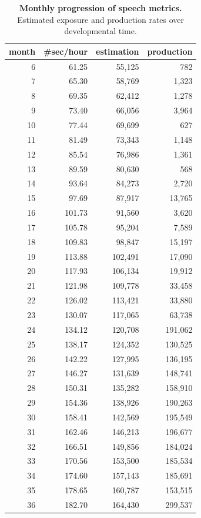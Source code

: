 \begin{table}[!h]
\centering
\begin{tabular}{rrrr}
\toprule
\textbf{month} & \textbf{\#sec/hour} & \textbf{estimation} & \textbf{production} \\
\midrule
6 & 61.25 & 55,125 & 782 \\
7 & 65.30 & 58,769 & 1,323 \\
8 & 69.35 & 62,412 & 1,278 \\
9 & 73.40 & 66,056 & 3,964 \\
10 & 77.44 & 69,699 & 627 \\
11 & 81.49 & 73,343 & 1,148 \\
12 & 85.54 & 76,986 & 1,361 \\
13 & 89.59 & 80,630 & 568 \\
14 & 93.64 & 84,273 & 2,720 \\
15 & 97.69 & 87,917 & 13,765 \\
16 & 101.73 & 91,560 & 3,620 \\
17 & 105.78 & 95,204 & 7,589 \\
18 & 109.83 & 98,847 & 15,197 \\
19 & 113.88 & 102,491 & 17,090 \\
20 & 117.93 & 106,134 & 19,912 \\
21 & 121.98 & 109,778 & 33,458 \\
22 & 126.02 & 113,421 & 33,880 \\
23 & 130.07 & 117,065 & 63,738 \\
24 & 134.12 & 120,708 & 191,062 \\
25 & 138.17 & 124,352 & 130,525 \\
26 & 142.22 & 127,995 & 136,195 \\
27 & 146.27 & 131,639 & 148,741 \\
28 & 150.31 & 135,282 & 158,910 \\
29 & 154.36 & 138,926 & 190,263 \\
30 & 158.41 & 142,569 & 195,549 \\
31 & 162.46 & 146,213 & 196,677 \\
32 & 166.51 & 149,856 & 184,024 \\
33 & 170.56 & 153,500 & 185,534 \\
34 & 174.60 & 157,143 & 185,691 \\
35 & 178.65 & 160,787 & 153,515 \\
36 & 182.70 & 164,430 & 299,537 \\
\bottomrule
\end{tabular}
\caption{\textbf{Monthly progression of speech metrics.} Estimated exposure and production rates over developmental time.}
\label{tab:speech-metrics}
\end{table}

